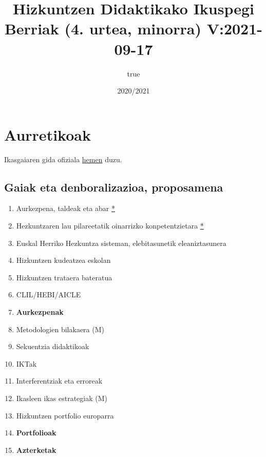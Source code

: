 \documentclass[
]{book}
\title{Hizkuntzen Didaktikako Ikuspegi Berriak (4. urtea, minorra) V:2021-09-17}
\author{true}
\date{2020/2021}
\providecommand{\tightlist}{%
  \setlength{\itemsep}{0pt}\setlength{\parskip}{0pt}}
\begin{document}
\maketitle

{
\setcounter{tocdepth}{1}
\tableofcontents
}
\hypertarget{aurretikoak}{%
\chapter*{Aurretikoak}\label{aurretikoak}}

Ikasgaiaren gida ofiziala \href{https://www.ehu.eus/eu/lehen-hezkuntzako-gradua-bizkaia/kreditu-eta-irakasgaiak?p_redirect=consultaAsignatura\&p_cod_proceso=egr\&p_anyo_acad=20190\&p_ciclo=X\&p_curso=4\&p_cod_asignatura=27574}{hemen} duzu.

\hypertarget{gaiak-eta-denboralizazioa-proposamena}{%
\section*{Gaiak eta denboralizazioa, proposamena}\label{gaiak-eta-denboralizazioa-proposamena}}

\begin{enumerate}
\def\labelenumi{\arabic{enumi})}
\tightlist
\item
  Aurkezpena, taldeak eta abar \href{../diapoak/0-Aurkezpena-21.pdf}{*}
\item
  Hezkuntzaren lau pilareetatik oinarrizko konpetentzietara \href{../diapoak/01-diapo.html}{*}
\item
  Euskal Herriko Hezkuntza sisteman, elebitasunetik eleaniztasunera
\item
  Hizkuntzen kudeatzea eskolan
\item
  Hizkuntzen trataera bateratua
\item
  CLIL/HEBI/AICLE
\item
  \textbf{Aurkezpenak}
\item
  Metodologien bilakaera (M)
\item
  Sekuentzia didaktikoak
\item
  IKTak
\item
  Interferentziak eta erroreak
\item
  Ikasleen ikas estrategiak (M)
\item
  Hizkuntzen portfolio europarra
\item
  \textbf{Portfolioak}
\item
  \textbf{Azterketak}
\end{enumerate}
\end{document}
